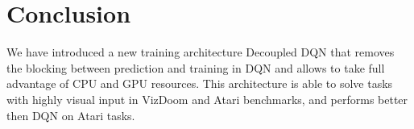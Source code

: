 \section{Conclusion}

We have introduced a new training architecture Decoupled DQN that removes the blocking
between prediction and training in DQN and allows to take full advantage of CPU and GPU resources.
This architecture is able to solve tasks with highly visual input in VizDoom and Atari benchmarks,
and performs better then DQN on Atari tasks.
